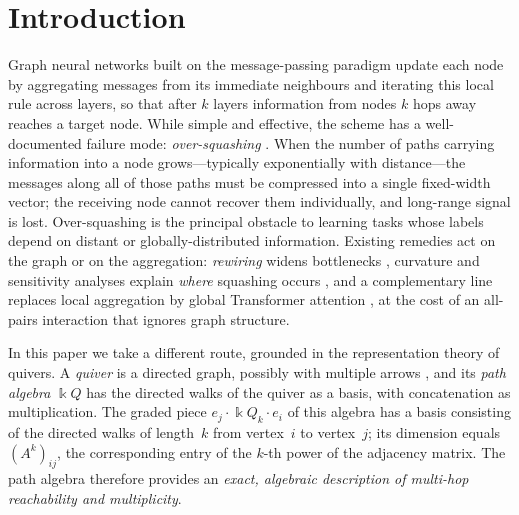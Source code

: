 \documentclass[runningheads]{llncs}
\newcommand{\kk}{\Bbbk}
\newcommand{\kQ}{\kk Q}
\newcommand{\Adj}{A}
\begin{document}
\section{Introduction}

Graph neural networks built on the message-passing paradigm
\cite{gilmer2017neural} update each node by aggregating messages from its
immediate neighbours and iterating this local rule across layers, so that after
$k$ layers information from nodes $k$ hops away reaches a target node. While
simple and effective, the scheme has a well-documented failure mode:
\emph{over-squashing} \cite{alon2021bottleneck}. When the number of paths
carrying information into a node grows---typically exponentially with
distance---the messages along all of those paths must be compressed into a
single fixed-width vector; the receiving node cannot recover them individually,
and long-range signal is lost. Over-squashing is the principal obstacle to
learning tasks whose labels depend on distant or globally-distributed
information. Existing remedies act on the graph or on the aggregation:
\emph{rewiring} widens bottlenecks \cite{topping2022understanding},
curvature and sensitivity analyses explain \emph{where} squashing occurs
\cite{digiovanni2023oversquashing}, and a complementary line replaces local
aggregation by global Transformer attention \cite{vaswani2017attention}, at the
cost of an all-pairs interaction that ignores graph structure.

In this paper we take a different route, grounded in the representation theory
of quivers. A \emph{quiver} is a directed graph, possibly with multiple arrows
\cite{schiffler2014quiver,assem2006elements}, and its \emph{path algebra} $\kQ$
has the directed walks of the quiver as a basis, with concatenation as
multiplication. The graded piece $e_j\cdot\kQ_k\cdot e_i$ of this algebra has a
basis consisting of the directed walks of length~$k$ from vertex~$i$ to
vertex~$j$; its dimension equals $(\Adj^k)_{ij}$, the corresponding entry of
the $k$-th power of the adjacency matrix. The path algebra therefore provides
an \emph{exact, algebraic description of multi-hop reachability and
multiplicity}.
\end{document}
